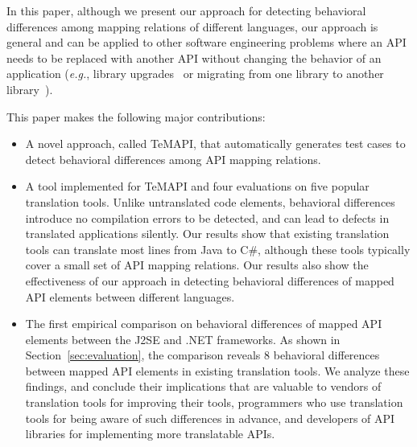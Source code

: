 In this paper, although we present our approach for detecting behavioral differences among mapping relations of different languages, our approach is general and can be applied to other software engineering problems where an API needs to be replaced with another API without changing the behavior of an application (\emph{e.g.}, library upgrades~\citep{Kawrykow:2009} or migrating from one library to another library~\citep{nita2010using}).

This paper makes the following major contributions:

\begin{itemize}\vspace*{-1ex}
\item A novel approach, called TeMAPI, that automatically generates test cases to detect behavioral differences among API mapping relations. %
\item A tool implemented for TeMAPI and four evaluations on five popular translation tools. Unlike untranslated code elements, behavioral differences introduce no compilation errors to be detected, and can lead to defects in translated applications silently. Our results show that existing translation tools can translate most lines from Java to C\#, although these tools typically cover a small set of API mapping relations. Our results also show the effectiveness of our approach in detecting behavioral differences of mapped API elements between different languages.
\item The first empirical comparison on behavioral differences of mapped API elements between the J2SE and .NET frameworks. As shown in Section~\ref{sec:evaluation}, the comparison reveals 8 behavioral differences between mapped API elements in existing translation tools. We analyze these findings, and conclude their implications that are valuable to vendors of translation tools for improving their tools, programmers who use translation tools for being aware of such differences in advance, and developers of API libraries for implementing more translatable APIs.
\end{itemize}\vspace*{-1ex}

